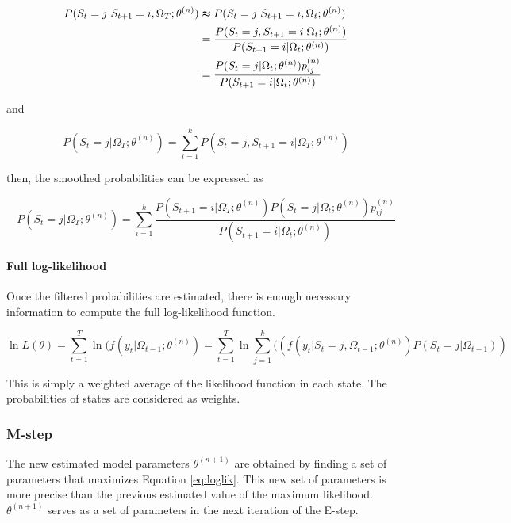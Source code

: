 \begin{align}
P(S_{t}=j|S_{t+1}=i,\Omega_{T};\theta^{(n)}) & \thickapprox P(S_{t}=j|S_{t+1}=i,\Omega_{t};\theta^{(n)})\nonumber \\
 & =\frac{P(S_{t}=j,S_{t+1}=i|\Omega_{t};\theta^{(n)})}{P(S_{t+1}=i|\Omega_{t};\theta^{(n)})}\nonumber \\
 & =\frac{P(S_{t}=j|\Omega_{t};\theta^{(n)})p_{ij}^{(n)}}{P(S_{t+1}=i|\Omega_{t};\theta^{(n)})}
\end{align}

and

\begin{equation}
P(S_{t}=j|\Omega_{T};\theta^{(n)})=\sum_{i=1}^{k}P(S_{t}=j,S_{t+1}=i|\Omega_{T};\theta^{(n)})
\end{equation}

then, the smoothed probabilities can be expressed as

\begin{equation}
P(S_{t}=j|\Omega_{T};\theta^{(n)})=\sum_{i=1}^{k}\frac{P(S_{t+1}=i|\Omega_{T};\theta^{(n)})P(S_{t}=j|\Omega_{t};\theta^{(n)})p_{ij}^{(n)}}{P(S_{t+1}=i|\Omega_{t};\theta^{(n)})}
\end{equation}


\paragraph{Full log-likelihood}

Once the filtered probabilities are estimated, there is enough necessary
information to compute the full log-likelihood function.

\begin{equation}
\ln L(\theta)=\sum_{t=1}^{T}\ln(f(y_{t}|\Omega_{t-1};\theta^{(n)})=\sum_{t=1}^{T}\ln\sum_{j=1}^{k}((f(y_{t}|S_{t}=j,\Omega_{t-1};\theta^{(n)})P(S_{t}=j|\Omega_{t-1}))\label{eq:loglik}
\end{equation}

This is simply a weighted average of the likelihood function in each
state. The probabilities of states are considered as weights.

\subsubsection{M-step}

The new estimated model parameters $\theta^{(n+1)}$ are obtained
by finding a set of parameters that maximizes Equation \ref{eq:loglik}.
This new set of parameters is more precise than the previous estimated
value of the maximum likelihood. $\theta^{(n+1)}$ serves as a set
of parameters in the next iteration of the E-step. 

